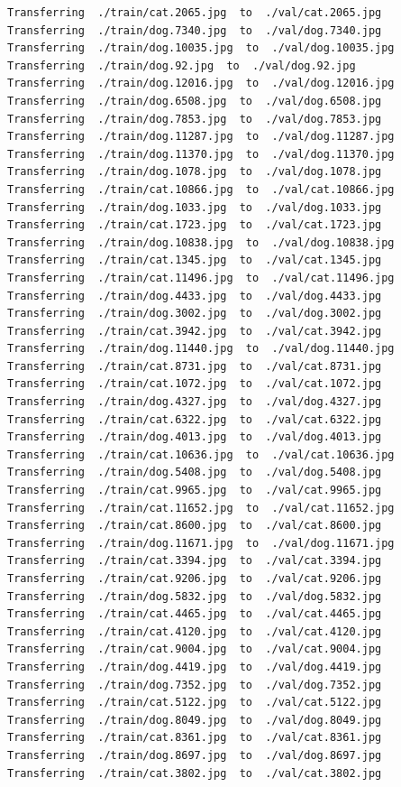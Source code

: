 \documentclass[]{book}
\theoremstyle{definition}
\theoremstyle{definition}
\theoremstyle{definition}
\theoremstyle{remark}
\begin{document}
\begin{verbatim}
Transferring  ./train/cat.2065.jpg  to  ./val/cat.2065.jpg
Transferring  ./train/dog.7340.jpg  to  ./val/dog.7340.jpg
Transferring  ./train/dog.10035.jpg  to  ./val/dog.10035.jpg
Transferring  ./train/dog.92.jpg  to  ./val/dog.92.jpg
Transferring  ./train/dog.12016.jpg  to  ./val/dog.12016.jpg
Transferring  ./train/dog.6508.jpg  to  ./val/dog.6508.jpg
Transferring  ./train/dog.7853.jpg  to  ./val/dog.7853.jpg
Transferring  ./train/dog.11287.jpg  to  ./val/dog.11287.jpg
Transferring  ./train/dog.11370.jpg  to  ./val/dog.11370.jpg
Transferring  ./train/dog.1078.jpg  to  ./val/dog.1078.jpg
Transferring  ./train/cat.10866.jpg  to  ./val/cat.10866.jpg
Transferring  ./train/dog.1033.jpg  to  ./val/dog.1033.jpg
Transferring  ./train/cat.1723.jpg  to  ./val/cat.1723.jpg
Transferring  ./train/dog.10838.jpg  to  ./val/dog.10838.jpg
Transferring  ./train/cat.1345.jpg  to  ./val/cat.1345.jpg
Transferring  ./train/cat.11496.jpg  to  ./val/cat.11496.jpg
Transferring  ./train/dog.4433.jpg  to  ./val/dog.4433.jpg
Transferring  ./train/dog.3002.jpg  to  ./val/dog.3002.jpg
Transferring  ./train/cat.3942.jpg  to  ./val/cat.3942.jpg
Transferring  ./train/dog.11440.jpg  to  ./val/dog.11440.jpg
Transferring  ./train/cat.8731.jpg  to  ./val/cat.8731.jpg
Transferring  ./train/cat.1072.jpg  to  ./val/cat.1072.jpg
Transferring  ./train/dog.4327.jpg  to  ./val/dog.4327.jpg
Transferring  ./train/cat.6322.jpg  to  ./val/cat.6322.jpg
Transferring  ./train/dog.4013.jpg  to  ./val/dog.4013.jpg
Transferring  ./train/cat.10636.jpg  to  ./val/cat.10636.jpg
Transferring  ./train/dog.5408.jpg  to  ./val/dog.5408.jpg
Transferring  ./train/cat.9965.jpg  to  ./val/cat.9965.jpg
Transferring  ./train/cat.11652.jpg  to  ./val/cat.11652.jpg
Transferring  ./train/cat.8600.jpg  to  ./val/cat.8600.jpg
Transferring  ./train/dog.11671.jpg  to  ./val/dog.11671.jpg
Transferring  ./train/cat.3394.jpg  to  ./val/cat.3394.jpg
Transferring  ./train/cat.9206.jpg  to  ./val/cat.9206.jpg
Transferring  ./train/dog.5832.jpg  to  ./val/dog.5832.jpg
Transferring  ./train/cat.4465.jpg  to  ./val/cat.4465.jpg
Transferring  ./train/cat.4120.jpg  to  ./val/cat.4120.jpg
Transferring  ./train/cat.9004.jpg  to  ./val/cat.9004.jpg
Transferring  ./train/dog.4419.jpg  to  ./val/dog.4419.jpg
Transferring  ./train/dog.7352.jpg  to  ./val/dog.7352.jpg
Transferring  ./train/cat.5122.jpg  to  ./val/cat.5122.jpg
Transferring  ./train/dog.8049.jpg  to  ./val/dog.8049.jpg
Transferring  ./train/cat.8361.jpg  to  ./val/cat.8361.jpg
Transferring  ./train/dog.8697.jpg  to  ./val/dog.8697.jpg
Transferring  ./train/cat.3802.jpg  to  ./val/cat.3802.jpg

\end{verbatim}
\end{document}
